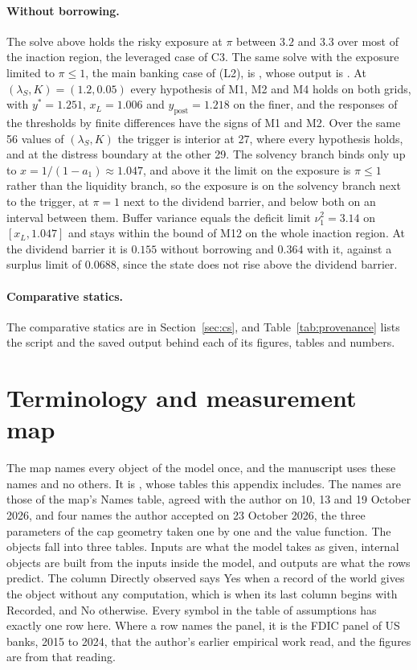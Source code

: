 \paragraph{Without borrowing.} The solve above holds the risky exposure at
$\pi$ between $3.2$ and $3.3$ over most of the inaction region, the leveraged
case of C3. The same solve with the exposure limited to $\pi\le1$, the main
banking case of \citet{bayraktar2026} (L2), is
, whose output is
. At $(\lambda_S,K)=(1.2,0.05)$ every
hypothesis of M1, M2 and M4 holds on both grids, with $y^*=1.251$,
$x_L=1.006$ and $y_{\text{post}}=1.218$ on the finer, and the responses of the
thresholds by finite differences have the signs of M1 and M2. Over the same 56
values of $(\lambda_S,K)$ the trigger is interior at 27, where every hypothesis
holds, and at the distress boundary at the other 29. The solvency branch binds
only up to $x=1/(1-a_1)\approx1.047$, and above it the limit on the exposure is
$\pi\le1$ rather than the liquidity branch, so the exposure is on the solvency
branch next to the trigger, at $\pi=1$ next to the dividend barrier, and below
both on an interval between them. Buffer variance equals the deficit limit
$\nu_1^2=3.14$ on $[x_L,1.047]$ and stays within the bound of M12 on the whole
inaction region. At the dividend barrier it is $0.155$ without borrowing and
$0.364$ with it, against a surplus limit of $0.0688$, since the state does not
rise above the dividend barrier.

\paragraph{Comparative statics.} The comparative statics are in
Section~\ref{sec:cs}, and Table~\ref{tab:provenance} lists the script and the
saved output behind each of its figures, tables and numbers.

\section{Terminology and measurement map}
\label{app:terms}

The map names every object of the model once, and the manuscript uses these
names and no others. It is , whose tables
this appendix includes. The names are those of the map's Names table, agreed
with the author on 10, 13 and 19 October 2026, and four names the author
accepted on 23 October 2026, the three parameters of the cap geometry taken
one by one and the value function. The objects fall into three
tables. Inputs are what the model takes as given, internal objects are built
from the inputs inside the model, and outputs are what the rows predict. The
column Directly observed says Yes when a record of the world gives the object
without any computation, which is when its last column begins with Recorded,
and No otherwise. Every symbol in the table of assumptions has exactly one row
here. Where a row names the panel, it is the FDIC panel of US banks, 2015 to
2024, that the author's earlier empirical work read, and the figures are from
that reading.

